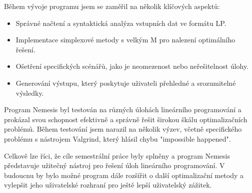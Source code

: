 \documentclass[czech, sem, kiv, he, pdf, viewonly]{fasthesis}
\begin{document}
Během vývoje programu jsem se zaměřil na několik klíčových aspektů:
\begin{itemize}
    \item Správné načtení a syntaktická analýza vstupních dat ve formátu LP.
    \item Implementace simplexové metody s velkým M pro nalezení optimálního řešení.
    \item Ošetření specifických scénářů, jako je neomezenost nebo neřešitelnost úlohy.
    \item Generování výstupu, který poskytuje uživateli přehledné a srozumitelné výsledky.
\end{itemize}

Program Nemesis byl testován na různých úlohách lineárního programování a prokázal svou schopnost efektivně a správně řešit širokou škálu optimalizačních problémů. Během testování jsem narazil na několik výzev, včetně specifického problému s nástrojem Valgrind, který hlásil chybu "impossible happened".

Celkově lze říci, že cíle semestrální práce byly splněny a program Nemesis představuje užitečný nástroj pro řešení úloh lineárního programování. V budoucnu by bylo možné program dále rozšířit o další optimalizační metody a vylepšit jeho uživatelské rozhraní pro ještě lepší uživatelský zážitek.
%
%
%
%
%
%
\backmatter
\printbibliography
\listoflistings
\backpage
\end{document}
